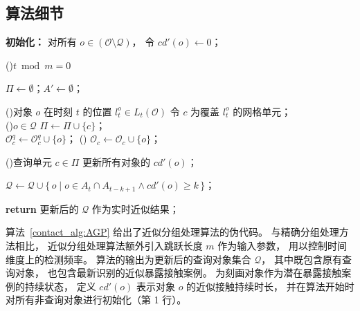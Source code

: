 \subsection{算法细节}
\begin{algorithm}[tb]
    \caption{近似分组处理算法}
    \label{contact_alg:AGP}

    \BlankLine
    \textbf{初始化：} 对所有 $o \in (\mathcal{O}\setminus\mathcal{Q})$， 令 $cd'(o)\leftarrow 0$；

    \If(){$t \bmod m = 0$}{
        $\Pi \leftarrow \emptyset$；$A' \leftarrow \emptyset$；

        \ForEach(){对象 $o$ 在时刻 $t$ 的位置 $l_t^o \in L_t(\mathcal{O})$}{
            令 $c$ 为覆盖 $l_t^o$ 的网格单元；\\
            \uIf(){$o \in \mathcal{Q}$}{
                $\Pi \leftarrow \Pi \cup \{c\}$；\\
                $\mathcal{O}_c^q \leftarrow \mathcal{O}_c^q \cup \{o\}$；
            }
            \Else(){%
                $\mathcal{O}_c \leftarrow \mathcal{O}_c \cup \{o\}$；
            }
        }

        \ForEach(){查询单元 $c \in \Pi$}{
        }
        更新所有对象的 $cd'(o)$； 

        $\mathcal{Q} \leftarrow \mathcal{Q} \cup
        \{\, o \mid o \in A_t \cap A_{t-k+1} \land cd'(o) \ge k \,\}$；
    }

    \textbf{return} 更新后的 $\mathcal{Q}$ 作为实时近似结果；
\end{algorithm}
算法~\ref{contact_alg:AGP} 给出了近似分组处理算法的伪代码。 与精确分组处理方法相比， 近似分组处理算法额外引入跳跃长度 $m$ 作为输入参数， 用以控制时间维度上的检测频率。 算法的输出为更新后的查询对象集合 $\mathcal{Q}$， 其中既包含原有查询对象， 也包含最新识别的近似暴露接触案例。 为刻画对象作为潜在暴露接触案例的持续状态， 定义 $cd'(o)$ 表示对象 $o$ 的近似接触持续时长， 并在算法开始时对所有非查询对象进行初始化（第 1 行）。

